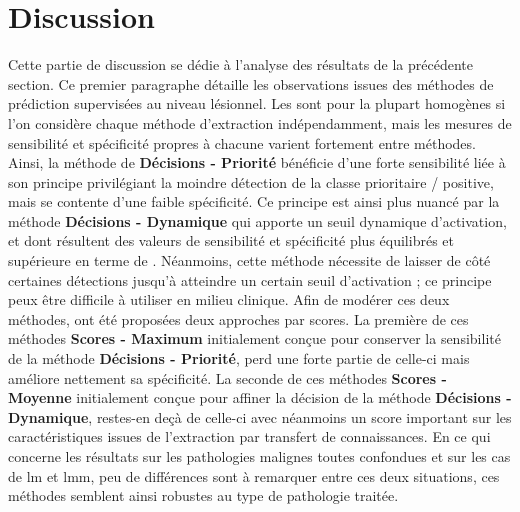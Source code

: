 \section{Discussion}
Cette partie de discussion se dédie à l'analyse des résultats de la précédente section. Ce premier paragraphe détaille les observations issues des méthodes de prédiction supervisées au niveau lésionnel. Les \fscore{} sont pour la plupart homogènes si l'on considère chaque méthode d'extraction indépendamment, mais les mesures de sensibilité et spécificité propres à chacune varient fortement entre méthodes. Ainsi, la méthode de \textbf{Décisions - Priorité} bénéficie d'une forte sensibilité liée à son principe privilégiant la moindre détection de la classe prioritaire / positive, mais se contente d'une faible spécificité. Ce principe est ainsi plus nuancé par la méthode \textbf{Décisions - Dynamique} qui apporte un seuil dynamique d'activation, et dont résultent des valeurs de sensibilité et spécificité plus équilibrés et supérieure en terme de \fscore{}. Néanmoins, cette méthode nécessite de laisser de côté certaines détections jusqu'à atteindre un certain seuil d'activation ; ce principe peux être difficile à utiliser en milieu clinique. Afin de modérer ces deux méthodes, ont été proposées deux approches par scores. La première de ces méthodes \textbf{Scores - Maximum} initialement conçue pour conserver la sensibilité de la méthode \textbf{Décisions - Priorité}, perd une forte partie de celle-ci mais améliore nettement sa spécificité. La seconde de ces méthodes \textbf{Scores - Moyenne} initialement conçue pour affiner la décision de la méthode \textbf{Décisions - Dynamique}, restes-en deçà de celle-ci avec néanmoins un score important sur les caractéristiques issues de l'extraction par transfert de connaissances. En ce qui concerne les résultats sur les pathologies malignes toutes confondues et sur les cas de \gls{lm} et \gls{lmm}, peu de différences sont à remarquer entre ces deux situations, ces méthodes semblent ainsi robustes au type de pathologie traitée.\par
\clearpage

